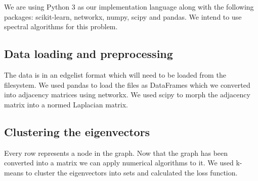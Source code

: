 \documentclass{article}
\begin{document}
We are using Python 3 as our implementation language along with the following packages: scikit-learn, networkx, numpy, scipy and pandas. We intend to use spectral algorithms for this problem.

\subsection{Data loading and preprocessing}

The data is in an edgelist format which will need to be loaded from the filesystem. We used pandas to load the files as DataFrames which we converted into adjacency matrices using networkx. We used scipy to morph the adjacency matrix into a normed Laplacian matrix.
	

\subsection{Clustering the eigenvectors}

Every row represents a node in the graph. Now that the graph has been converted into a matrix we can apply numerical algorithms to it. We used k-means to cluster the eigenvectors into sets and calculated the loss function.
\end{document}
